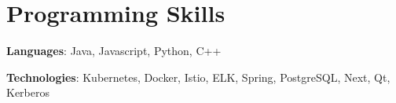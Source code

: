 

\section{Programming Skills}\label{sec:programming-skills}
\resumeSubHeadingListStart
\item{
    \textbf{Languages}{: Java, Javascript, Python, C++}
}
\item{
    \textbf{Technologies}{: Kubernetes, Docker, Istio, ELK, Spring, PostgreSQL, Next, Qt, Kerberos}
}
\resumeSubHeadingListEnd
